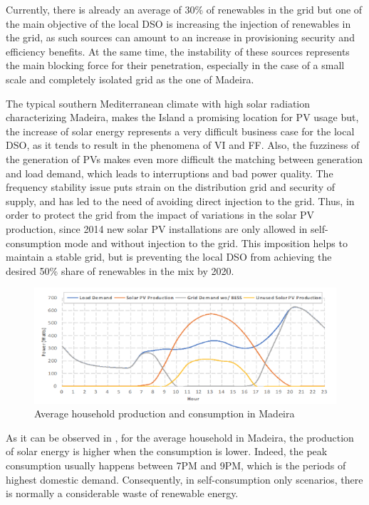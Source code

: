 Currently, there is already an average of 30\% of renewables in the grid but one of the main objective of the local \ac{DSO} is increasing the injection of renewables in the grid, as such sources can amount to an increase in provisioning security and efficiency benefits. At the same time, the instability of these sources represents the main blocking force for their penetration, especially in the case of a small scale and completely isolated grid as the one of Madeira.


The typical southern Mediterranean climate with high solar radiation characterizing Madeira, makes the Island a promising location for \ac{PV} usage but, the increase of solar energy represents a very difficult business case for the local \ac{DSO}, as it tends to result in the phenomena of \ac{VI} and \ac{FF}. Also, the fuzziness of the generation of \acp{PV} makes even more difficult the matching between generation and load demand, which leads to interruptions and bad power quality. The frequency stability issue puts strain on the distribution grid and security of supply, and has led to the need of avoiding direct injection to the grid. Thus, in order to protect the grid from the impact of variations in the solar \ac{PV} production, since 2014 new solar \ac{PV} installations are only allowed in self-consumption mode and without injection to the grid. This imposition helps to maintain a stable grid, but is preventing the local \ac{DSO} from achieving the desired 50\% share of renewables in the mix by 2020.


\begin{figure}[h]
\centering
\includegraphics[width=1\textwidth]{./Images/grafico_intro}
\caption{Average household production and consumption in Madeira}
\label{fig:graph_intro}
\end{figure}

As it can be observed in , for the average household in Madeira, the production of solar energy is higher when the consumption is lower. Indeed, the peak consumption usually happens between 7PM and 9PM, which is the periods of highest domestic demand. Consequently, in self-consumption only scenarios, there is normally a considerable waste of renewable energy. 


